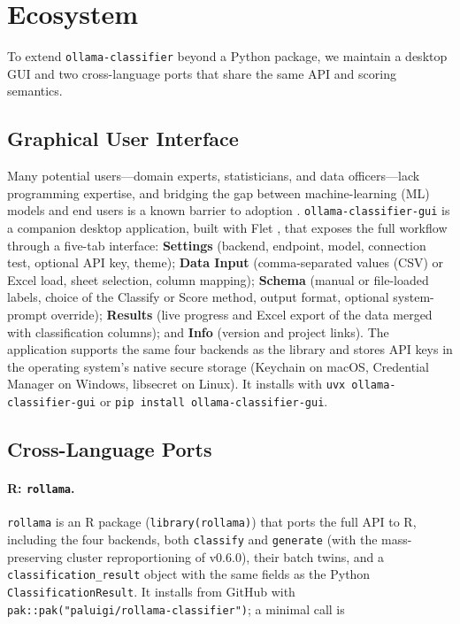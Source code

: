 \documentclass[11pt,a4paper]{article}
\begin{document}
\section{Ecosystem}
\label{sec:ecosystem}

To extend \texttt{ollama-classifier} beyond a Python package, we maintain a
desktop GUI and two cross-language ports that share the same API and scoring
semantics.

\subsection{Graphical User Interface}

Many potential users---domain experts, statisticians, and data officers---lack
programming expertise, and bridging the gap between machine-learning (ML)
models and end users is
a known barrier to adoption \citep{amershi2019software, he2021automl}. \texttt{ollama-classifier-gui} \citep{ollama-classifier-gui}
is a companion desktop application, built with Flet \citep{flet}, that exposes
the full workflow through a five-tab interface: \textbf{Settings} (backend,
endpoint, model, connection test, optional API key, theme); \textbf{Data
Input} (comma-separated values (CSV) or Excel load, sheet selection, column
mapping); \textbf{Schema}
(manual or file-loaded labels, choice of the Classify or Score method, output
format, optional system-prompt override); \textbf{Results} (live progress and
Excel export of the data merged with classification columns); and
\textbf{Info} (version and project links). The application supports the same
four backends as the library and stores API keys in the operating system's
native secure storage (Keychain on macOS, Credential Manager on Windows,
libsecret on Linux). It installs with \texttt{uvx ollama-classifier-gui} or
\texttt{pip install ollama-classifier-gui}.

\subsection{Cross-Language Ports}

\paragraph{R: \texttt{rollama}.}
\texttt{rollama} \citep{rollama-classifier} is an R package
(\texttt{library(rollama)}) that ports the full API to R, including the four
backends, both \texttt{classify} and \texttt{generate} (with the
mass-preserving cluster reproportioning of v0.6.0), their batch twins, and
a \texttt{classification\_result} object with the same fields as the Python
\texttt{ClassificationResult}. It installs from GitHub with
\texttt{pak::pak("paluigi/rollama-classifier")}; a minimal call is
\end{document}
